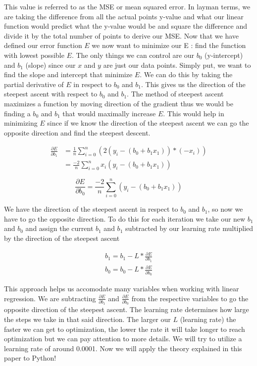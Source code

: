 \documentclass{article}
\begin{document}
\noindent This value is referred to as the MSE or mean squared error. In layman terms, we are taking the difference from all the actual points y-value
and what our linear function would predict what the y-value would be and square the difference and divide it by the total number of points to 
derive our MSE. Now that we have defined our error function $E$ we now want to minimize our E : find the function with lowest possible $E$. The only things
we can control are our $b_0$ (y-intercept) and $b_1$ (slope) since our $x$ and $y$ are just our data points. Simply put, we want to find the slope and intercept that minimize 
$E$. We can do this by taking the partial derivative of $E$ in respect to $b_0$ and $b_1$. This gives us the direction of the steepest ascent with respect to $b_0$
and $b_1$. The method of steepest ascent maximizes a function by moving direction of the gradient thus we would be finding a $b_0$ and $b_1$ that would maximally increase 
$E$. This would help in minimizing $E$ since if we know the direction of the steepest ascent we can go the opposite direction and find the steepest descent.


\begin{equation} 
\begin {split}
\frac{\partial E}{\partial b_1} &= \frac{1}{n} \sum_{i=0}^{n}(2(y_i - (b_0 + b_1x_1)) * (-x_i)) \\
&= \frac{-2}{n}\sum_{i=0}^{n}x_i(y_i - (b_0 + b_1x_1))
\end {split}
\end{equation}

\begin{equation} 
\frac{\partial E}{\partial b_0} = \frac{-2}{n}\sum_{i=0}^{n}(y_i - (b_0 + b_1x_1))
\end{equation}

\noindent We have the direction of the steepest ascent in respect to $b_0$ and $b_1$, so now we have to go the opposite direction. 
To do this for each iteration we take our new $b_1$ and $b_0$ and assign the current $b_1$ and $b_1$ subtracted by our learning rate multiplied 
by the direction of the steepest ascent 

\begin{equation} 
\begin{split}
b_1 = b_1 - L * \frac{\partial E}{\partial b_1} \\
b_0 = b_0 - L * \frac{\partial E}{\partial b_0}
\end{split}
\end{equation}

\noindent This approach helps us accomodate many variables when working with linear regression. We are subtracting $\frac{\partial E}{\partial b_1}$ 
and $\frac{\partial E}{\partial b_0}$ from the respective variables to go the opposite direction of the steepest ascent. The learning rate
determines how large the steps we take in that said direction. The larger our $L$ (learning rate) the faster we can get to optimization, the 
lower the rate it will take longer to reach optimization but we can pay attention to more details. We will try to utilize a learning rate of around
0.0001. Now we will apply the theory explained in this paper to Python!
\end{document}
